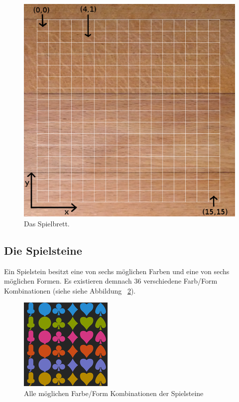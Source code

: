 \documentclass[a4paper, ngerman]{scrartcl}
\begin{document}
\begin{figure}[h] \centering 
	\includegraphics[scale = 0.3]{images/Spielbrett}
	\caption{Das Spielbrett.}
	\label{fig:Spielfeld}
\end{figure}

\subsection{Die Spielsteine}
Ein Spielstein besitzt eine von sechs möglichen Farben und eine von sechs möglichen Formen. Es existieren demnach 36 verschiedene Farb/Form Kombinationen (siehe siehe Abbildung ~\ref{fig:Spielsteine}).\\

\begin{figure}[h] \centering 
	\includegraphics[scale = 0.8]{images/Spielsteine}
	\caption{Alle möglichen Farbe/Form Kombinationen der Spielsteine}
	\label{fig:Spielsteine}
\end{figure}
\end{document}
